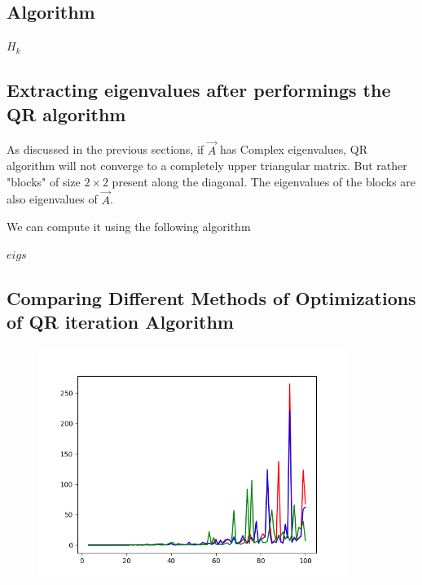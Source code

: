 \documentclass[journal]{IEEEtran}
\numberwithin{equation}{section}
\begin{document}
\subsection{Algorithm}

\begin{algorithmic}
    \EndFor
    \Return $H_k$
\end{algorithmic}

\subsection{Extracting eigenvalues after performings the QR algorithm}
As discussed in the previous sections, if $\vec{A}$ has Complex eigenvalues, QR algorithm will not converge to a completely upper triangular matrix. But rather "blocks" of size $2 \times 2$ present along the diagonal. The eigenvalues of the blocks are also eigenvalues of $\vec{A}$.

We can compute it using the following algorithm

\begin{algorithmic}
        \Else
        \EndIf
    \EndWhile
    \Return $eigs$
\end{algorithmic}

\subsection{Comparing Different Methods of Optimizations of QR iteration Algorithm}

\begin{figure}
    \includegraphics[width=10cm]{./figs/fig0.png}
    \centering
\end{figure}
\end{document}
